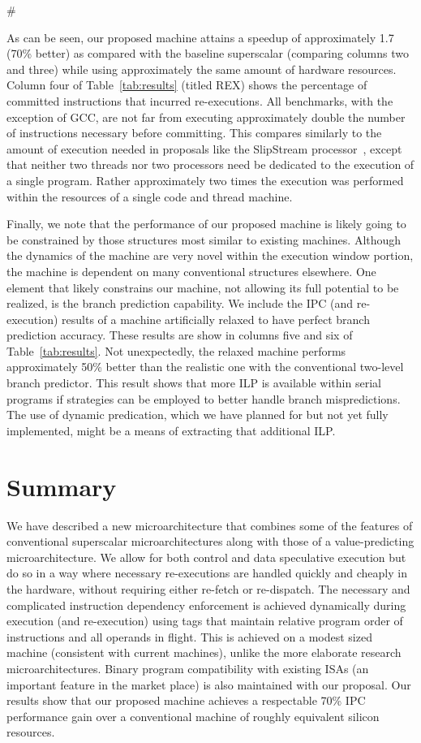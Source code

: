 #\documentclass[10pt,dvips]{article}
\begin{document}
%
As can be seen, our proposed machine attains a speedup of approximately
1.7 (70\% better) as compared with the baseline superscalar 
(comparing columns two and three) 
while using approximately the same amount of hardware resources.
Column four of Table~\ref{tab:results} (titled REX) shows the percentage
of committed instructions that incurred re-executions.
All benchmarks, with the exception of GCC, are not far
from executing approximately double the number of instructions
necessary before committing.
This compares similarly to the amount of execution needed
in proposals like the SlipStream processor~\cite{ibrahim03},
except that neither two threads nor two processors need be
dedicated to the execution of a single program. 
Rather approximately two times the execution was performed
within the resources of a single code and thread machine.

Finally, we note that the performance of our proposed machine
is likely going to be constrained by those structures most
similar to existing machines.  Although the dynamics of
the machine are very novel within the execution window portion,
the machine is dependent on many conventional structures elsewhere.
One element that likely constrains our machine, not allowing its
full potential to be realized, is the branch prediction
capability.  We include the IPC (and re-execution) results of a
machine artificially relaxed to have perfect branch prediction
accuracy.  These results are show in columns five and six of
Table~\ref{tab:results}.  Not unexpectedly, the relaxed machine performs
approximately 50\% better than the realistic one with the
conventional two-level branch predictor.
This result shows that more ILP is available within serial programs
if strategies can be employed to better handle branch mispredictions.
The use of dynamic predication, which we have planned for but not
yet fully implemented, might be a means of extracting that additional
ILP.
%
%
\vspace{-0.15in}
\section{Summary}
%
We have described a new microarchitecture that combines
some of the features of conventional superscalar microarchitectures
along with those of a value-predicting microarchitecture.
We allow for both control and data speculative execution
but do so in a way where necessary re-executions are handled
quickly and cheaply in the hardware, without requiring either
re-fetch or re-dispatch.  
The necessary and complicated instruction dependency
enforcement is achieved dynamically during execution (and re-execution)
using tags that maintain relative program order
of instructions and all operands in flight.
This is achieved on a modest sized machine (consistent with current
machines), unlike the more
elaborate research microarchitectures.
Binary program compatibility with existing ISAs (an important feature
in the market place) is also maintained with our proposal.
Our results show that our proposed machine achieves a respectable
70\% IPC performance gain over a conventional machine of roughly
equivalent silicon resources.
\end{document}
